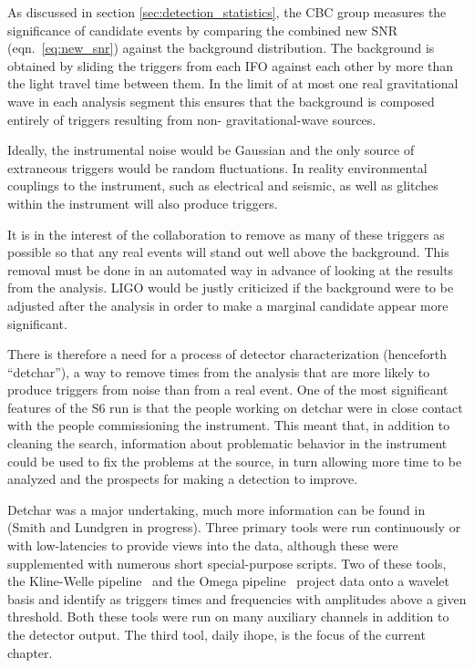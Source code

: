 \newcommand\weakheader[1]{
\vspace*{5mm}
\noindent {\it #1}
\vspace*{5mm}
}

\newcommand{\darmerr}{{\texttt DARM\_ERR} }

As discussed in section \ref{sec:detection_statistics}, the CBC group
measures the significance of candidate events by comparing the
combined new SNR (eqn.~\ref{eq:new_snr}) against the background
distribution.  The background is obtained by sliding the triggers from
each IFO against each other by more than the light travel time between
them.  In the limit of at most one real gravitational wave in each
analysis segment this ensures that the background is composed entirely
of triggers resulting from non- gravitational-wave sources.

Ideally, the instrumental noise would be Gaussian and the only source
of extraneous triggers would be random fluctuations.  In reality
environmental couplings to the instrument, such as electrical and
seismic, as well as glitches within the instrument will also produce
triggers.

It is in the interest of the collaboration to remove as many of these
triggers as possible so that any real events will stand out 
well above the background.  This removal must be done in
an automated way in advance of looking at the results from the
analysis.  LIGO would be justly criticized if the background were
to be adjusted after the analysis in order to make a marginal candidate
appear more significant.

There is therefore a need for a process of detector characterization
(henceforth ``detchar''), a way to remove times from the analysis that
are more likely to produce triggers from noise than from a real event.
One of the most significant features of the S6 run is that the people
working on detchar were in close contact with the people commissioning
the instrument.  This meant that, in addition to cleaning the search,
information about problematic behavior in the instrument could be used
to fix the problems at the source, in turn allowing more time to be
analyzed and the prospects for making a detection to improve.

Detchar was a major undertaking, much more information can be found in
(Smith and Lundgren in progress).  Three primary tools were run
continuously or with low-latencies to provide views into the data,
although these were supplemented with numerous short special-purpose
scripts.  Two of these tools, the Kline-Welle pipeline~\cite{} and the
Omega pipeline~\cite{} project data onto a wavelet basis and identify
as triggers times and frequencies with amplitudes above a given
threshold.  Both these tools were run on many auxiliary channels in
addition to the detector output.  The third tool, daily ihope, is the
focus of the current chapter.


